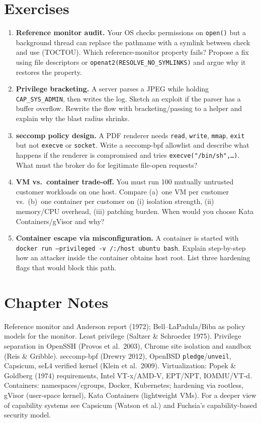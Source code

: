 \section{Exercises}
\label{sec:ch07-exercises}
\begin{enumerate}[label=E7.\arabic*, leftmargin=*, itemsep=0.6em]
    \item \textbf{Reference monitor audit.} Your OS checks permissions on \texttt{open()} but a background thread can replace the pathname with a symlink between check and use (TOCTOU). Which reference-monitor property fails? Propose a fix using file descriptors or \texttt{openat2(RESOLVE\_NO\_SYMLINKS)} and argue why it restores the property.
    \item \textbf{Privilege bracketing.} A server parses a JPEG while holding \texttt{CAP\_SYS\_ADMIN}, then writes the log. Sketch an exploit if the parser has a buffer overflow. Rewrite the flow with bracketing/passing to a helper and explain why the blast radius shrinks.
    \item \textbf{seccomp policy design.} A PDF renderer needs \texttt{read}, \texttt{write}, \texttt{mmap}, \texttt{exit} but not \texttt{execve} or \texttt{socket}. Write a seccomp-bpf allowlist and describe what happens if the renderer is compromised and tries \texttt{execve("/bin/sh",\dots)}. What must the broker do for legitimate file-open requests?
    \item \textbf{VM vs.\ container trade-off.} You must run 100 mutually untrusted customer workloads on one host. Compare (a)~one VM per customer vs.~(b)~one container per customer on (i) isolation strength, (ii) memory/CPU overhead, (iii) patching burden. When would you choose Kata Containers/gVisor and why?
    \item \textbf{Container escape via misconfiguration.} A container is started with \texttt{docker run --privileged -v /:/host ubuntu bash}. Explain step-by-step how an attacker inside the container obtains host root. List three hardening flags that would block this path.
\end{enumerate}
\section*{Chapter Notes}
Reference monitor and Anderson report (1972); Bell--LaPadula/Biba as policy models for the monitor. Least privilege (Saltzer \& Schroeder 1975). Privilege separation in OpenSSH (Provos et al.\ 2003), Chrome site isolation and sandbox (Reis \& Gribble). seccomp-bpf (Drewry 2012), OpenBSD \texttt{pledge}/\texttt{unveil}, Capsicum, seL4 verified kernel (Klein et al.\ 2009). Virtualization: Popek \& Goldberg (1974) requirements, Intel VT-x/AMD-V, EPT/NPT, IOMMU/VT-d. Containers: namespaces/cgroups, Docker, Kubernetes; hardening via rootless, gVisor (user-space kernel), Kata Containers (lightweight VMs). For a deeper view of capability systems see Capsicum (Watson et al.) and Fuchsia's capability-based security model.
